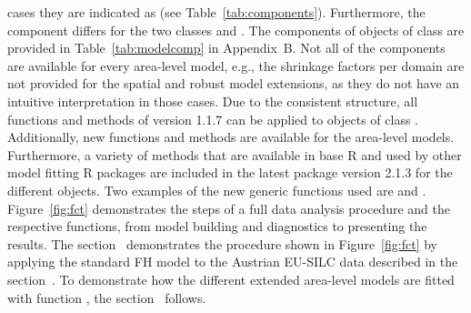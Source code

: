 cases they are indicated as  (see Table~\ref{tab:components}). Furthermore,
the  component differs for the two classes  and . The components of objects of class  are provided in Table~\ref{tab:modelcomp} in
Appendix~B. Not all of the components are available for every
area-level model, e.g., the shrinkage factors per domain are not provided for
the spatial and robust model extensions, as they do not have an intuitive interpretation in those cases.
Due to the consistent structure, all functions and methods of
 version 1.1.7 can be applied to objects of class .
Additionally, new functions and methods are available for the area-level models.
Furthermore, a variety of methods that are available in base R and used by other model fitting R packages are included in the latest package version 2.1.3 for the different  objects. Two examples of the new generic functions used are  and . Figure~\ref{fig:fct} demonstrates the steps of a full data analysis procedure and
the respective functions, from model building and diagnostics to presenting the
results. The section~ demonstrates the procedure shown in
Figure~\ref{fig:fct} by applying the standard FH model to the Austrian
EU-SILC data described in the section~. To demonstrate how the different
extended area-level models are fitted with function ,
the section~ follows.

